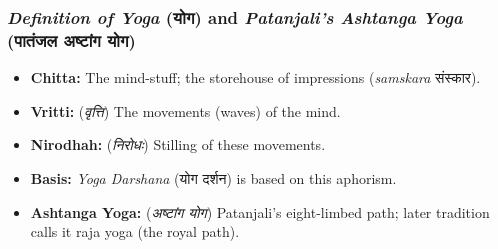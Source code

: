 \begin{frame}[fragile]\frametitle{\textit{Definition of Yoga} (योग) and \textit{Patanjali's Ashtanga Yoga} (पातंजल अष्टांग योग)}

    \begin{itemize}
        \item \textbf{Chitta:} The mind-stuff; the storehouse of impressions (\textit{samskara} संस्कार).
        \item \textbf{Vritti:} (\textit{वृत्ति}) The movements (waves) of the mind.
        \item \textbf{Nirodhah:}  (\textit{निरोधः}) Stilling of these movements.
        \item \textbf{Basis:} \textit{Yoga Darshana} (योग दर्शन) is based on this aphorism.
        \item \textbf{Ashtanga Yoga:}  (\textit{अष्टांग योग}) Patanjali's eight-limbed path; later tradition calls it raja yoga (the royal path).
    \end{itemize}

\end{frame}




